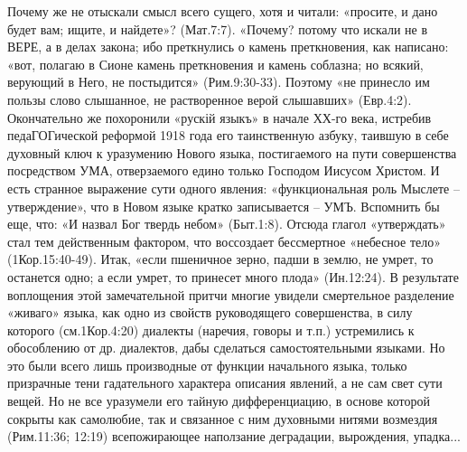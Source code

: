       Почему же не отыскали смысл всего сущего, хотя и читали: «просите, и дано будет вам; ищите, и найдете»? (Мат.7:7). «Почему?  потому что искали не в ВЕРЕ, а в делах закона;  ибо преткнулись о камень преткновения, как написано: «вот, полагаю в Сионе камень преткновения и камень соблазна;  но всякий, верующий в Него, не постыдится» (Рим.9:30-33). Поэтому «не принесло им пользы слово слышанное, не растворенное верой слышавших» (Евр.4:2). Окончательно же похоронили «рускій языкъ» в начале ХХ-го века, истребив педаГОГической реформой 1918 года его таинственную азбуку, таившую в себе духовный ключ к уразумению Нового языка, постигаемого на пути совершенства посредством УМА, отверзаемого едино только Господом Иисусом Христом. И есть странное выражение сути одного явления: «функциональная роль Мыслете – утверждение», что в Новом языке кратко записывается – УМЪ.
Вспомнить бы еще, что: «И назвал Бог твердь небом» (Быт.1:8). Отсюда глагол «утверждать» стал тем действенным фактором, что воссоздает бессмертное «небесное тело» (1Кор.15:40-49).
      Итак, «если пшеничное зерно, падши в землю, не умрет, то останется одно; а если умрет, то принесет много плода» (Ин.12:24). В результате воплощения этой замечательной притчи многие увидели смертельное разделение «живаго» языка, как одно из свойств руководящего совершенства, в силу которого (см.1Кор.4:20) диалекты (наречия, говоры и т.п.) устремились к обособлению от др. диалектов, дабы сделаться самостоятельными языками. Но это были всего лишь производные от функции начального языка, только призрачные тени гадательного характера описания явлений, а не сам свет сути вещей. Но не все уразумели его тайную дифференциацию, в основе которой сокрыты как самолюбие, так и связанное с ним духовными нитями возмездия (Рим.11:36; 12:19)  всепожирающее наползание деградации, вырождения, упадка...

